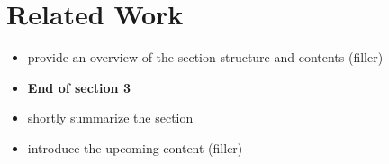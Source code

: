 \section{Related Work}

\begin{itemize}
  \item provide an overview of the section structure and contents (filler)
\end{itemize}






\begin{itemize}
  \item \textbf{End of section 3}
  \item shortly summarize the section
  \item introduce the upcoming content (filler)
\end{itemize}
